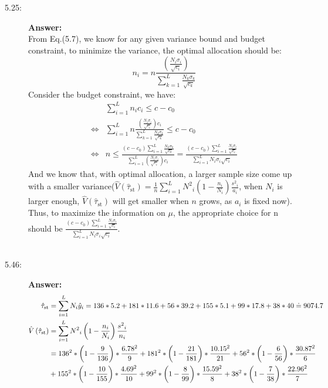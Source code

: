 \documentclass{article}
\begin{document}
\begin{description}
    \item[5.25:]{\bf Answer:}\\
        From Eq.(5.7), we know for any given variance bound and budget constraint, to minimize the variance, the optimal allocation should be: $$n_i=n\frac{\left(\frac{N_i\sigma _i}{\sqrt{c_i}}\right)}{\sum _{k=1}^L \frac{N_k\sigma _k}{\sqrt{c_k}}}$$
        Consider the budget constraint, we have:
        \begin{align}
          &\sum _{i=1}^L n_ic_i\leq c-c_0\\
          \Longleftrightarrow &\sum _{i=1}^L n\frac{\left(\frac{N_i\sigma _i}{\sqrt{c_i}}\right)c_i}{\sum _{k=1}^L \frac{N_k\sigma _k}{\sqrt{c_k}}}\leq c-c_0\\
          \Longleftrightarrow &n\leq \frac{\left(c-c_0\right)\sum _{i=1}^L \frac{N_k\sigma _k}{\sqrt{c_k}}}{\sum _{i=1}^L \left(\frac{N_i\sigma _i}{\sqrt{c_i}}\right)c_i}=\frac{\left(c-c_0\right)\sum _{i=1}^L \frac{N_i\sigma _i}{\sqrt{c_i}}}{\sum _{i=1}^L N_i\sigma _i\sqrt{c_i}}
        \end{align}
        And we know that, with optimal allocation, a larger sample size come up with a smaller variance($\hat{V}\left(\hat{\tau }_{\text{st}}\right)=\frac{1}{n}\sum _{i=1}^L N^2{}_i\left(1-\frac{n_i}{N_i}\right)\frac{s^2{}_i}{a_i}$, when $N_i$ is larger enough, $\hat{V}\left(\hat{\tau }_{\text{st}}\right)$ will get smaller when $n$ grows, as $a_i$ is fixed now). Thus, to maximize the information on $\mu$, the appropriate choice for n should be $\frac{\left(c-c_0\right)\sum _{i=1}^L \frac{N_i\sigma _i}{\sqrt{c_i}}}{\sum _{i=1}^L N_i\sigma _i\sqrt{c_i}}$.\\\\
    \item[5.46:]{\bf Answer:}\\
        \begin{align}
          \hat{\tau }_{\text{st}}&=\sum _{i=1}^L N_i\hat{y}_i=136*5.2+181*11.6+56*39.2+155*5.1+99*17.8+38*40\doteq 9074.7\\
          \hat{V}\left(\hat{\tau }_{\text{st}}\right)&=\sum _{i=1}^L N^2{}_i\left(1-\frac{n_i}{N_i}\right)\frac{s^2{}_i}{n_i}\\ \notag
          &=136^2*\left(1-\frac{9}{136}\right)*\frac{6.78^2}{9}+181^2*\left(1-\frac{21}{181}\right)*\frac{10.15^2}{21}+56^2*\left(1-\frac{6}{56}\right)*\frac{30.87^2}{6}\\ \notag
          &+155^2*\left(1-\frac{10}{155}\right)*\frac{4.69^2}{10}+99^2*\left(1-\frac{8}{99}\right)*\frac{15.59^2}{8}+38^2*\left(1-\frac{7}{38}\right)*\frac{22.96^2}{7}\\

\end{align}
\end{description}
\end{document}
